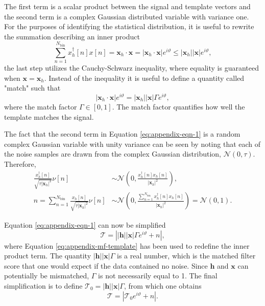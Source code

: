 The first term is a scalar product between the signal and template vectors and the second term is a complex Gaussian distributed variable with variance one. For the purposes of identifying the statistical distribution, it is useful to rewrite the summation describing an inner product 
\begin{equation}
    \sum_{n=1}^{N_\mathrm{bin}}{x_h^\dagger[n]x[n]}=\mathbf{x}_h\cdot\mathbf{x}=|\mathbf{x}_h\cdot\mathbf{x}|e^{i\vartheta}\leq|\mathbf{x}_h||\mathbf{x}|e^{i\vartheta},
\end{equation}
the last step utilizes the Cauchy-Schwarz inequality, where equality is guaranteed when $\mathbf{x}=\mathbf{x}_h$. Instead of the inequality it is useful to define a quantity called "match" such that 
\begin{equation}
    |\mathbf{x}_h\cdot\mathbf{x}|e^{i\vartheta}=|\mathbf{x}_h||\mathbf{x}|\Gamma e^{i\vartheta},
\end{equation}
where the match factor $\Gamma\in[0,1]$. The match factor quantifies how well the template matches the signal.

The fact that the second term in Equation \ref{eq:appendix-eqn-1} is a random complex Gaussian variable with unity variance can be seen by noting that each of the noise samples are drawn from the complex Gaussian distribution, $\mathcal{N}(0,\tau)$. Therefore,
\begin{align}
    \frac{x_h^\dagger[n]}{\sqrt{\tau|\mathbf{x}_h|^2}}\nu[n]&\sim\mathcal{N}\left(0,\frac{x_h^\dagger[n]x_h[n]}{|\mathbf{x}_h|^2}\right),\\
    n=\sum_{n=1}^{N_\mathrm{bin}}{\frac{x_h[n]}{\sqrt{\tau|\mathbf{x}_h|^2}}\nu[n]}&\sim\mathcal{N}\left(0,\frac{\sum_{n=1}^{N_\mathrm{bin}}{x_h^\dagger[n]x_h[n]}}{|\mathbf{x}_h|^2}\right)=\mathcal{N}(0,1).
\end{align}

Equation \ref{eq:appendix-eqn-1} can now be simplified
\begin{equation}
    \mathcal{T}= \left||\mathbf{h}||\mathbf{x}|\Gamma e^{i\vartheta}+n\right|,
\end{equation}
where Equation \ref{eq:appendix-mf-template} has been used to redefine the inner product term. The quantity $|\mathbf{h}||\mathbf{x}|\Gamma$ is a real number, which is the matched filter score that one would expect if the data contained no noise. Since $\mathbf{h}$ and $\mathbf{x}$ can potentially be mismatched, $\Gamma$ is not necessarily equal to 1. The final simplification is to define $\mathcal{T}_\mathrm{0}=|\mathbf{h}||\mathbf{x}|\Gamma$, from which one obtains
\begin{equation}
    \mathcal{T}=|\mathcal{T}_\mathrm{0}e^{i\vartheta}+n|.
    \label{eq:appendix-simplified-mf-score}
\end{equation}


